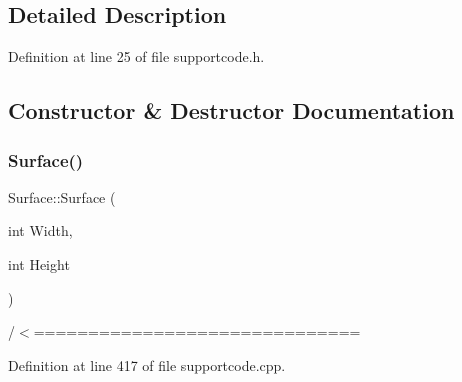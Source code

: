 \subsection{Detailed Description}


Definition at line 25 of file supportcode.\+h.



\subsection{Constructor \& Destructor Documentation}
\mbox{\label{class_surface_a323ba9165c8635e84eb0c490fe88d846}} 
\subsubsection{\texorpdfstring{Surface()}{Surface()}}
{\footnotesize\ttfamily Surface\+::\+Surface (\begin{DoxyParamCaption}\item[{int}]{Width,  }\item[{int}]{Height }\end{DoxyParamCaption})}



/$<$============================== 



Definition at line 417 of file supportcode.\+cpp.


